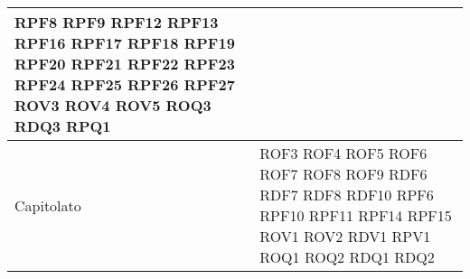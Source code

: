 \begin{longtable}{| p{5cm} | p{5cm} |}
					RPF8 \newline
					RPF9 \newline
					RPF12 \newline
					RPF13 \newline
					RPF16 \newline
					RPF17 \newline
					RPF18 \newline
					RPF19 \newline
					RPF20 \newline
					RPF21 \newline
					RPF22 \newline
					RPF23 \newline
					RPF24 \newline
					RPF25\newline
					RPF26 \newline
					RPF27 \newline
					ROV3 \newline
					ROV4 \newline
					ROV5 \newline
					ROQ3 \newline
					RDQ3 \newline
					RPQ1 \newline
					 \\ \hline
					
		\rowcolor{LightGray}
		Capitolato & ROF3 \newline
					ROF4 \newline
					ROF5 \newline
					ROF6 \newline
					ROF7 \newline
					ROF8 \newline
					ROF9 \newline
					RDF6 \newline
					RDF7 \newline
					RDF8 \newline
					RDF10 \newline
					RPF6 \newline
					RPF10 \newline
					RPF11 \newline
					RPF14 \newline
					RPF15 \newline
					ROV1 \newline
					ROV2 \newline
					RDV1 \newline
					RPV1 \newline
					ROQ1 \newline
					ROQ2\newline
					RDQ1\newline
					RDQ2 \newline	
		 \\
		

\end{longtable}
